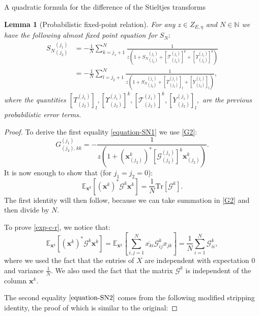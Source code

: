 \documentclass[11pt, a4paper, oneside]{book}
\numberwithin{equation}{chapter}
\newcommand{\Tr}{\mathrm{Tr}}
\newcommand{\x}{\mathbf{x}}
\newcommand{\beq}{\begin{equation}}
\newcommand{\eeq}{\end{equation}}
\newtheorem{lem}[thm]{Lemma}
\begin{document}
\begin{section}{A quadratic formula for the difference of the Stieltjes transforms}
%
\begin{lem}[Probabilistic fixed-point relation]
For any $z \in Z_{E,\eta}$ and $N \in \mathbb{N}$ we have the following almost fixed point equation for $S_N:$
%
\begin{align}
{S_N}^{(j_1)}_{(j_2)} &= - \frac{1}{N}\sum \limits_{k=j_1+1}^N
\frac{1}{ z \left(1+{S_N}^{(j_1)}_{(j_2)} + [\mathcal{T}_{(j_2)}^{(j_1)}]^k + [\Upsilon_{(j_2)}^{(j_1)}]^k \right)}  \label{equation-SN1} \\ 
&= - \frac{1}{N} \sum \limits_{l=j_2+1}^N \frac{1}{ z \left(1+ {S_N}^{(j_1)}_{(j_2)} + [T_{(j_2)}^{(j_1)}]_l + [Y_{(j_2)}^{(j_1)}]_l \right)}, \label{equation-SN2}
\end{align}
%
where the quantities $[T_{(j_2)}^{(j_1)}]_l, [\Upsilon_{(j_2)}^{(j_1)}]^k, [\mathcal{T}_{(j_2)}^{(j_1)}]^k, [Y_{(j_2)}^{(j_1)}]_l,$ are the previous probabilistic error terms.
%
\end{lem}
%
\begin{proof} To derive the first equality \eqref{equation-SN1} we use \eqref{G2}:
%
\begin{equation*}
G_{(j_2), kk}^{(j_1)} = -\frac{1}{z \left(1+  (\x_{(j_2)}^k)^* [\mathcal{G}_{(j_2)}^{(j_1)}]^k
\x_{(j_2)}^k \right)}.
\end{equation*}
%
It is now enough to show that (for $j_1=j_2=0$):
\beq \label{exp-c-r}
\mathbb{E}_{\x^{k}} \left [ (\textbf{x}^k)^* \mathcal{G}^{k} \textbf{x}^k \right ] = \frac{1}{N} \Tr \left [ \mathcal{G}^{k} \right ].
\eeq
%
The first identity will then follow, because we can take summation in \eqref{G2} and then divide by $N$.

To prove \eqref{exp-c-r}, we notice that:
\[
\mathbb{E}_{\x^{k}} \left [ (\textbf{x}^k)^* \mathcal{G}^{k} \textbf{x}^k \right ] = \mathbb{E}_{\x^{k}} \left [ \sum \limits_{i,j=1}^N \overline{x_{ki}} \mathcal{G}_{ij}^{k} x_{jk} \right ] = \frac{1}{N} \sum_{i=1}^N \mathcal{G}_{ii}^{k},
\]
where we used the fact that the entries of $X$ are independent with expectation $0$ and variance $\frac{1}{N}$. We also used the fact that the matrix $\mathcal{G}^{k}$ is independent of the column $\x^{k}.$

The second equality $\eqref{equation-SN2}$ comes from the following modified stripping identity, the proof of which is similar to the original:


\end{proof}
\end{section}
\end{document}
